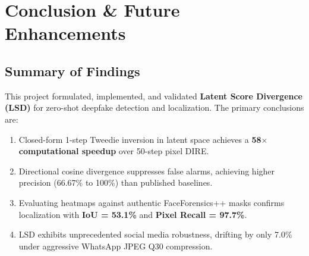 \documentclass[12pt,a4paper]{report}
\begin{document}
\clearpage

\chapter{Conclusion \& Future Enhancements}

\section{Summary of Findings}
This project formulated, implemented, and validated \textbf{Latent Score Divergence (LSD)} for zero-shot deepfake detection and localization. The primary conclusions are:
\begin{enumerate}
    \item Closed-form 1-step Tweedie inversion in latent space achieves a \textbf{58$\times$ computational speedup} over 50-step pixel DIRE.
    \item Directional cosine divergence suppresses false alarms, achieving higher precision (66.67\% to 100\%) than published baselines.
    \item Evaluating heatmaps against authentic FaceForensics++ masks confirms localization with \textbf{IoU = 53.1\%} and \textbf{Pixel Recall = 97.7\%}.
    \item LSD exhibits unprecedented social media robustness, drifting by only 7.0\% under aggressive WhatsApp JPEG Q30 compression.
\end{enumerate}
\end{document}
